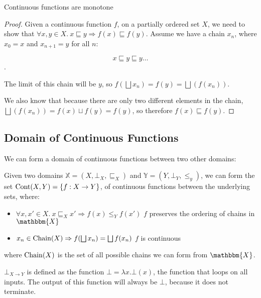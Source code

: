 \vspace{0.25cm}

\begin{thm}\label{mono}
Continuous functions are monotone
\end{thm}

\begin{proof}
Given a continuous function $f$, on a partially ordered set $X$, we need to show that $\forall x,y \in X. \ x \sqsubseteq y \Rightarrow f(x) \sqsubseteq f(y)$.
Assume we have a chain $x_n$, where $x_0 = x$ and $x_{n + 1} = y$ for all $n$:

\[x \sqsubseteq y \sqsubseteq y \dots \] .

The limit of this chain will be $y$, so $f(\bigsqcup x_n) = f(y) = \bigsqcup (f (x_n))$.

We also know that because there are only two different elements in the chain, $\bigsqcup (f (x_n)) = f(x) \sqcup f(y) = f(y)$, so therefore $f(x) \sqsubseteq f(y)$.

\end{proof}

\subsection{Domain of Continuous Functions}\label{cont}

We can form a domain of continuous functions between two other domains:

Given two domains $\mathbb{X} = (X, \bot_X, \sqsubseteq_X)$ and $\mathbb{Y} = (Y, \bot_Y, \leq_y)$, we can form the set $\operatorname{Cont}(X,Y) =\{ f : X \to Y\}$, of continuous functions between the underlying sets, where:

\begin{itemize}
\item{$\forall x, x' \in X. \ x \sqsubseteq_X x' \Rightarrow f(x) \leq_Y f(x')$ \hspace{1cm} $f$ preserves the ordering of chains in $\mathbbm{X}$}
\item{$x_n \in \operatorname{Chain}(X) \Rightarrow f(\bigsqcup x_n) = \bigsqcup f(x_n)$ \hspace{2cm} $f$ is continuous}
\end{itemize} 

where $\operatorname{Chain}(X)$ is the set of all possible chains we can form from  $\mathbbm{X}$.

$\bot_{X \to Y}$ is defined as the function $\bot = \lambda x. \bot (x)$, the function that loops on all inputs. The output of this function will always be $\bot$, because it does not terminate. 

